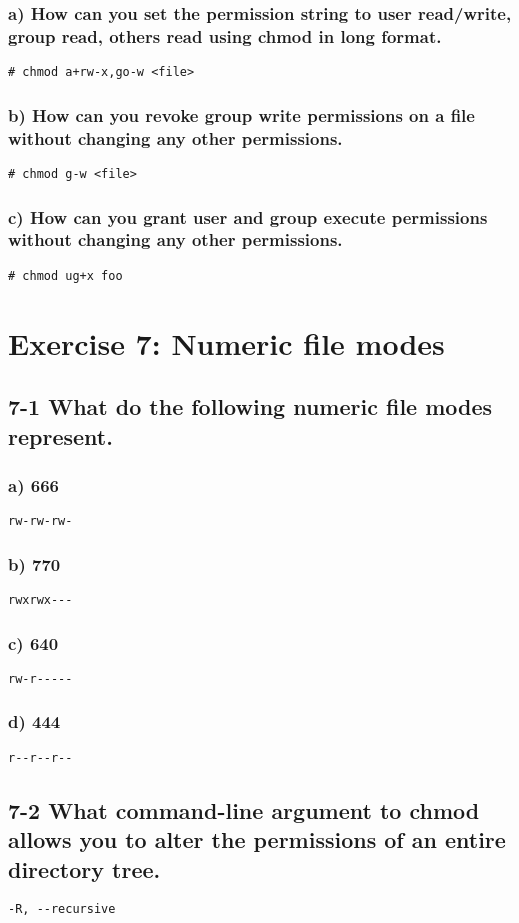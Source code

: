 \subsubsection{a) How can you set the permission string to user read/write, group read, others read using chmod in long format.}
\verb=# chmod a+rw-x,go-w <file>=

\subsubsection{b) How can you revoke group write permissions on a file without changing any other permissions.}
\verb=# chmod g-w <file>=

\subsubsection{c) How can you grant user and group execute permissions without changing any other permissions.}
\verb=# chmod ug+x foo=



\section{Exercise 7: Numeric file modes}
\subsection{7-1 What do the following numeric file modes represent.}

\subsubsection{a) 666}
\verb=rw-rw-rw-=

\subsubsection{b) 770}
\verb=rwxrwx---=

\subsubsection{c) 640}
\verb=rw-r-----=

\subsubsection{d) 444}
\verb=r--r--r--=

\subsection{7-2 What command-line argument to chmod allows you to alter the permissions of an entire directory tree.}
\verb=-R, --recursive=


